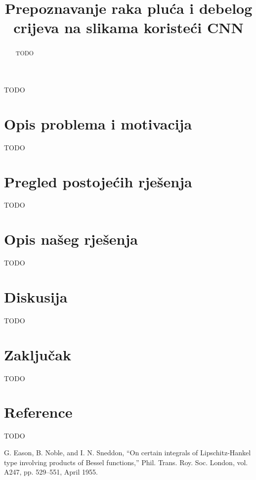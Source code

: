 \documentclass[conference]{IEEEtran}
\begin{document}
\title{Prepoznavanje raka pluća i debelog crijeva na slikama koristeći CNN}

\author{
\and
{}
\and
{}
\and
{}
\and
{}
\and
{}
}

\maketitle

\begin{abstract}
TODO
\end{abstract}

\begin{IEEEkeywords}
TODO
\end{IEEEkeywords}

\section{Opis problema i motivacija}
TODO

\section{Pregled postojećih rješenja}
TODO
\section{Opis našeg rješenja}
TODO
\section{Diskusija}
TODO
\section{Zaključak}
TODO
\section*{Reference}
TODO
\begin{thebibliography}{00}
 G. Eason, B. Noble, and I. N. Sneddon, ``On certain integrals of Lipschitz-Hankel type involving products of Bessel functions,'' Phil. Trans. Roy. Soc. London, vol. A247, pp. 529--551, April 1955.
\end{thebibliography}
\end{document}
